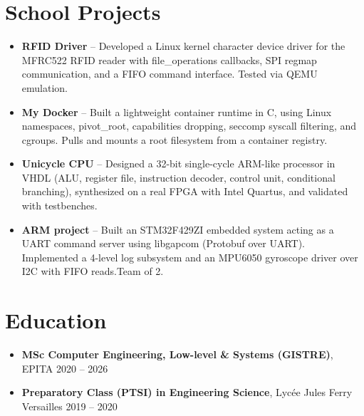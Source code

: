 \documentclass[9pt,a4paper]{article}
\begin{document}
\section*{School Projects}
\begin{tcolorbox}[mybox]
\begin{itemize}
\item \textbf{RFID Driver} -- Developed a Linux kernel character device driver for the MFRC522 RFID reader with file\_operations callbacks, SPI regmap communication, and a FIFO command interface. Tested via QEMU emulation.

\item \textbf{My Docker} -- Built a lightweight container runtime in C, using Linux namespaces, pivot\_root, capabilities dropping, seccomp syscall filtering, and cgroups. Pulls and mounts a root filesystem from a container registry.

\item \textbf{Unicycle CPU} -- Designed a 32-bit single-cycle ARM-like processor in VHDL (ALU, register file, instruction decoder, control unit, conditional branching), synthesized on a real FPGA with Intel Quartus, and validated with testbenches.

\item \textbf{ARM project} -- Built an STM32F429ZI embedded system acting as a UART command server using libgapcom (Protobuf over UART). Implemented a 4-level log subsystem and an MPU6050 gyroscope driver over I2C with FIFO reads.Team of 2.
\end{itemize}
\end{tcolorbox}


\section*{Education}
\begin{tcolorbox}[mybox]
\begin{itemize}
\item \textbf{MSc Computer Engineering, Low-level \& Systems (GISTRE)}, EPITA {\small{\hfill 2020 – 2026}}

\item \textbf{Preparatory Class (PTSI) in Engineering Science}, Lycée Jules Ferry Versailles {\small{\hfill 2019 – 2020}}
\end{itemize}
\end{tcolorbox}
\end{document}
